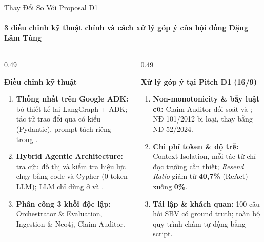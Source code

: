\documentclass[aspectratio=1610,10pt,xcolor={table}]{beamer}
\begin{document}
\begin{frame}{Thay Đổi So Với Proposal D1}
  \framesubtitle{3 điều chỉnh kỹ thuật chính và cách xử lý góp ý của hội đồng \hfill Đặng Lâm Tùng}

  \begin{columns}[t]
    \begin{column}{0.49\textwidth}
      \begin{block}{\textbf{Điều chỉnh kỹ thuật}}
        \begin{enumerate}\footnotesize
          \item \textbf{Thống nhất trên Google ADK:} bỏ thiết kế lai LangGraph + ADK; tác tử trao đổi qua  có kiểu (Pydantic), prompt tách riêng trong .
          \item \textbf{Hybrid Agentic Architecture:} tra cứu đồ thị và kiểm tra hiệu lực chạy bằng code và Cypher (0 token LLM); LLM chỉ dùng ở  và .
          \item \textbf{Phân công 3 khối độc lập:} Orchestrator \& Evaluation, Ingestion \& Neo4j, Claim Auditor.
        \end{enumerate}
      \end{block}
    \end{column}

    \begin{column}{0.49\textwidth}
      \begin{block}{\textbf{Xử lý góp ý tại Pitch D1 (16/9)}}
        \begin{enumerate}\footnotesize
          \item \textbf{Non-monotonicity \& bẫy luật cũ:} Claim Auditor đối soát  và ; NĐ 101/2012 bị loại, thay bằng NĐ 52/2024.
          \item \textbf{Chi phí token \& độ trễ:} Context Isolation, mỗi tác tử chỉ đọc trường cần thiết; \emph{Resend Ratio} giảm từ \textbf{40,7\%} (ReAct) xuống \textbf{0\%}.
          \item \textbf{Tái lập \& khách quan:} 100 câu hỏi SBV có ground truth; toàn bộ quy trình chấm tự động bằng script.
        \end{enumerate}
      \end{block}
    \end{column}
  \end{columns}
\end{frame}
\end{document}

